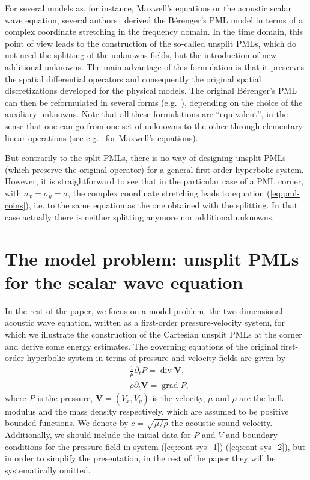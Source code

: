\documentclass[a4paper]{article}
\def\div{\mathop{\mathrm{div}}\nolimits}
\def\grad{\mathop{\boldsymbol{\mathrm{grad}}}\nolimits}
\def\bV{\boldsymbol{V}}
\begin{document}
\begin{rem}
For several models as, for instance, Maxwell's equations or the acoustic 
scalar wave equation, 
several authors~\cite{Chew:1994,Collino:1998:1,Collino:1998:2,
Rappaport:1995,Turkel1998533} derived the B\'erenger's PML model in 
terms of a complex coordinate stretching in the frequency domain. 
In the time domain, 
this point of view leads to the construction 
of the so-called unsplit PMLs, which do not need the splitting of the unknowns 
fields,  
 but the introduction of new 
additional unknowns. The main advantage of this formulation is that it 
preserves the spatial differential operators and consequently the original
spatial discretizations developed for the physical models.
The original B\'erenger's PML can then be reformulated 
in several forms (e.g.~\cite{ZC,BPG:04,Gedney96,Abarbanel:2002}), 
depending on the choice of the auxiliary unknowns. Note that all these 
formulations are ``equivalent'',  in the sense that one can go from one set of unknowns to the other through elementary linear operations 
(see e.g.~\cite{HDR-Bec-2003,BJ:02} for Maxwell's equations).

But contrarily to the split PMLs, there is no way of designing unsplit 
PMLs (which preserve the original operator) for a general first-order 
hyperbolic system. However,  it is straightforward to see that in the 
particular case of a PML corner, with $\sigma_x= \sigma_y=\sigma$, 
the complex coordinate stretching leads to equation (\ref{eq:pml-coins}), 
i.e. to the same equation as the one obtained with the splitting. 
In that case actually there is neither splitting anymore nor additional 
unknowns.
\end{rem}  

\section{The model problem: unsplit PMLs for the scalar wave equation}
\label{sec:model}
In the rest of the paper, we focus on a model problem, 
the two-dimensional acoustic wave equation, written as a first-order 
pressure-velocity system, for which  we  illustrate the construction 
of the Cartesian unsplit PMLs at the corner and derive some energy 
estimates. The governing equations of the original first-order 
hyperbolic system in terms of pressure and velocity fields are given by
\begin{align}
&\frac{1}{\mu}\partial_{t}P=\div \bV,\label{eq:cont-sys_1}\\
&\rho\partial_{t}\bV=\grad P,\label{eq:cont-sys_2}
\end{align}
where $P$ is the pressure, $\bV=(V_{x},V_{y})$ is the velocity,
 $\mu$ and $\rho$ are the bulk modulus and the mass density respectively,
which are assumed to be  positive bounded functions. 
We denote by $c=\sqrt{\mu/\rho}$ the acoustic sound velocity. 
 Additionally, we should include
the initial data for $P$ and $V$ and boundary conditions for the pressure
field in system (\ref{eq:cont-sys_1})-(\ref{eq:cont-sys_2}), but in order 
to simplify the presentation, in the rest of the paper they will be 
systematically omitted. 
 
\end{document}
